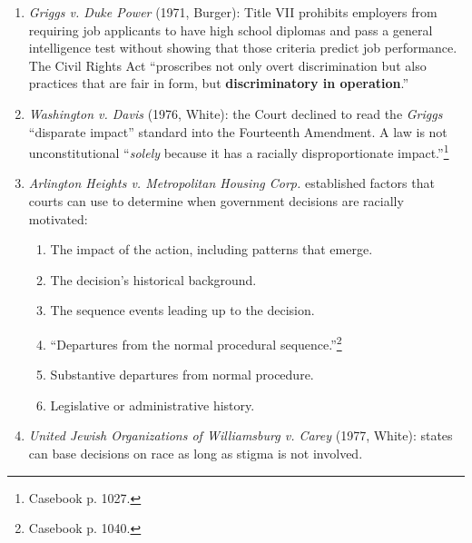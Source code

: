 \begin{enumerate}
\begin{enumerate}
\begin{enumerate}
            twenty-eight-sided figure.''\footnote{Casebook p. 1023.} The sole 
            purpose was to segregate voters by race.
        \end{enumerate}
        \item \emph{Gaston County v. United States}---Transferred De 
        Jure Discrimination: a voting literacy test disproportionately 
        disenfranchised blacks. The Court held that years of inferior 
        education meant that blacks were less equipped to pass the test, so 
        the test was discriminatory.
    \end{enumerate}
    \item \emph{Griggs v. Duke Power} (1971, Burger): Title VII prohibits 
    employers from requiring job applicants to have high school diplomas and 
    pass a general intelligence test without showing that those criteria 
    predict job performance. The Civil Rights Act ``proscribes not only overt 
    discrimination but also practices that are fair in form, but 
    \textbf{discriminatory in operation}.''
    \item \emph{Washington v. Davis} (1976, White): the Court declined to read 
    the \emph{Griggs} ``disparate impact'' standard into the Fourteenth 
    Amendment. A law is not unconstitutional ``\emph{solely} because it has a 
    racially disproportionate impact.''\footnote{Casebook p. 1027.}
    \item \emph{Arlington Heights v. Metropolitan Housing Corp.} established 
    factors that courts can use to determine when government decisions are 
    racially motivated:
    \begin{enumerate}
        \item The impact of the action, including patterns that emerge.
        \item The decision's historical background.
        \item The sequence events leading up to the decision.
        \item ``Departures from the normal procedural 
        sequence.''\footnote{Casebook p. 1040.}
        \item Substantive departures from normal procedure.
        \item Legislative or administrative history.
    \end{enumerate}
    \item \emph{United Jewish Organizations of Williamsburg v. Carey} (1977, 
    White): states can base decisions on race as long as stigma is not 
    involved.

\end{enumerate}
